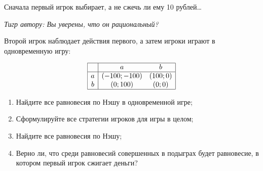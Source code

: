 \begin{problem}
Сначала первый игрок выбирает, а не сжечь ли ему 10 рублей\ldots \par
{\it Тигр  автору: Вы уверены, что он рациональный?} \par
Второй игрок наблюдает действия первого, а затем игроки играют в одновременную игру:\par
\[\begin{array}{|c|cc|}  \hline {} & {a} & {b} \\  \hline {a} & {\left(-100;-100\right)} & {\left(100;0\right)} \\ {b} & {\left(0;100\right)} & {\left(0;0\right)} \\  \hline  \end{array}\]
\begin{enumerate}
\item  Найдите все равновесия по Нэшу в одновременной игре;\par
\item Сформулируйте все стратегии игроков для игры в целом;\par
\item  Найдите все равновесия по Нэшу;\par
\item Верно ли, что среди равновесий совершенных в подыграх будет равновесие, в котором первый игрок сжигает деньги?
\end{enumerate}


\begin{sol}

\end{sol}
\end{problem}




